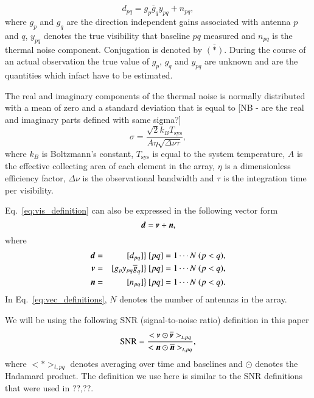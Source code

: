 \documentclass[a4paper,fleqn,usenatbib]{mnras}
\newcommand{\bd}{\bmath{d}}
\newcommand{\bv}{\bmath{v}}
\newcommand{\bn}{\bmath{n}}
\newcommand{\conj}[1]{\overline{#1}}
\begin{document}
\begin{equation}
\label{eq:vis_definition}
d_{pq} = g_{p}\conj{g}_{q}y_{pq} + n_{pq},
\end{equation}
where $g_{p}$ and $g_{q}$ are the direction independent gains associated with antenna $p$ and $q$, $y_{pq}$ denotes the true visibility that baseline $pq$ measured
and $n_{pq}$ is the thermal noise component. Conjugation is denoted by $\conj{(*)}$. During the course of an actual observation the true value of $g_p$, $g_q$ and $y_{pq}$ are unknown and are the quantities which infact have 
to be estimated.

The real and imaginary components of the thermal noise is normally distributed with a mean of zero and a standard deviation that is equal to [NB - are the real and imaginary parts defined with same sigma?]  
\begin{equation}
\sigma = \frac{\sqrt{2}k_{B}T_{\textrm{sys}}}{A\eta\sqrt{\Delta \nu \tau}}, 
\end{equation}
where $k_B$ is Boltzmann's constant, $T_{\textrm{sys}}$ is equal to the system temperature, $A$ is the effective collecting area of each element in the array, $\eta$ is a dimensionless
efficiency factor, $\Delta \nu$ is the observational bandwidth and $\tau$ is the integration time per visibility. 

Eq.~\eqref{eq:vis_definition} can also be expressed in the following vector form 
\begin{equation}
\bd = \bv + \bn, 
\end{equation}
where 
\begin{eqnarray}
 \bd &=& [d_{pq}] \big \} ~ [pq] = 1\cdots N ~ (p<q),\nonumber\\
 \bv &=& [g_p y_{pq}\conj{g}_q]  \big \} ~ [pq] = 1\cdots N ~ (p<q),\nonumber\\
 \bn &=& [n_{pq}]  \big \} ~ [pq] = 1\cdots N ~ (p<q).\label{eq:vec_definitions}
\end{eqnarray}
In Eq.~\eqref{eq:vec_definitions}, $N$ denotes the number of antennas in the array.

We will be using the following SNR (signal-to-noise ratio) definition in this paper  
\begin{equation}
\textrm{SNR} = \frac{<\bv\odot\conj{\bv}>_{t,pq}}{<\bn\odot\conj{\bn}>_{t,pq}}, 
\end{equation}
where $<*>_{t,pq}$ denotes averaging over time and baselines and $\odot$ denotes the Hadamard product. The definition we use here is similar 
to the SNR definitions that were used in ??,??.
\end{document}
